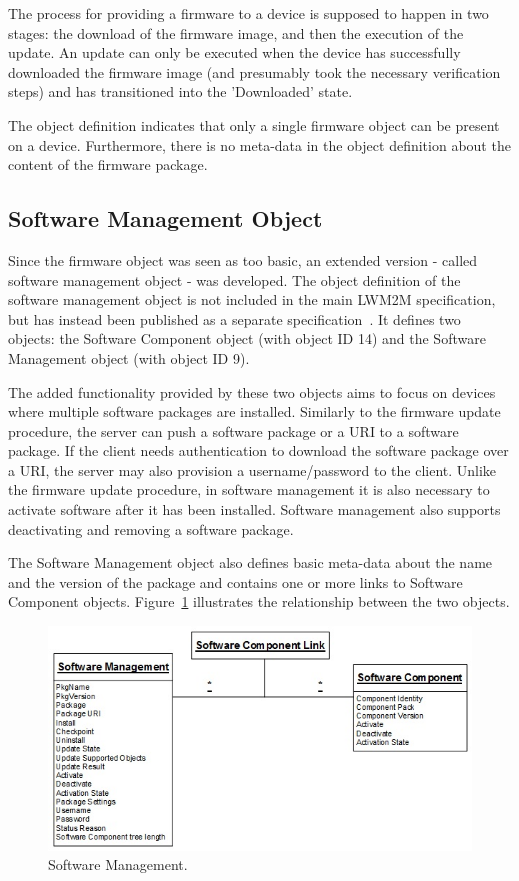 \documentclass[peerreview, a4paper, 7pt]{IEEEtran}
\begin{document}
The process for providing a firmware to a device is supposed to happen in two stages: the download of the firmware image, and then the execution of the update. An update can only be executed when the device has successfully downloaded the firmware image (and presumably took the necessary verification steps) and has transitioned into the 'Downloaded' state. 

The object definition indicates that only a single firmware object can be present on a device. Furthermore, there is no meta-data in the object definition about the content of the firmware package. 

\subsection{Software Management Object}
Since the firmware object was seen as too basic, an extended version - called software management object - was developed. The object definition of the software management object is not included in the main LWM2M specification, but has instead been published as a separate specification~\cite{SwMgmt}. It defines two objects: the Software Component object (with object ID 14) and the Software Management object (with object ID 9). 

The added functionality provided by these two objects aims to focus on devices where multiple software packages are installed. Similarly to the firmware update procedure, the server can push a software package or a URI to a software package. If the client needs authentication to download the software package over a URI, the server may also provision a username/password to the client. Unlike the firmware update procedure, in software management it is also necessary to activate software after it has been installed. Software management also supports deactivating and removing a software package. 

The Software Management object also defines basic meta-data about the name and the version of the package and contains one or more links to Software Component objects. Figure~\ref{software-management-figure} illustrates the relationship between the two objects. 

\begin{figure}[!htbp]
 \centering
 \includegraphics[scale=0.50]{software-management.jpg}
 \caption{Software Management.}
 \label{software-management-figure}
\end{figure}
\end{document}
